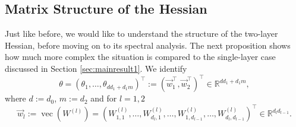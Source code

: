 \documentclass{article}
\begin{document}
\subsection{Matrix Structure of the Hessian}
Just like before, we would like to understand the structure of the two-layer Hessian, before moving on to its spectral analysis. The next proposition shows how much more complex the situation is compared to the single-layer case discussed in Section \ref{sec:mainresult1}. We identify 
\begin{equation}
\theta=(\theta_1,\dots,\theta_{dd_1+d_1m})^\top:=(\vec{w}_1^\top,\vec{w}_2^\top)^\top\in\mathbb{R}^{dd_1+d_1m},
\end{equation}
where $d:=d_0$, $m:=d_2$ and for $l=1,2$
\begin{equation}
\vec{w}_l:= \operatorname{vec}(W^{(l)})=(W^{(l)}_{1,1},\dots,W^{(l)}_{d_l,1},\dots,W^{(l)}_{1,d_{l-1}},\dots,W^{(l)}_{d_l,d_{l-1}})^\top\in\mathbb{R}^{d_ld_{l-1}}.
\end{equation}
\bigskip
\end{document}
